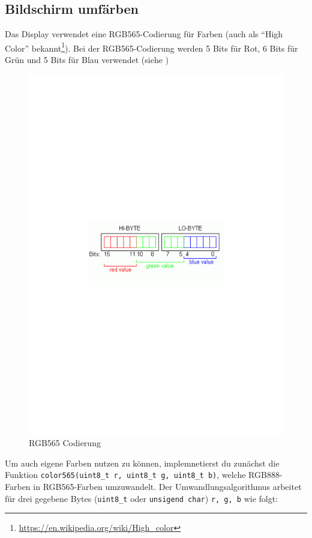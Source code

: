 \subsection{Bildschirm umfärben}
Das Display verwendet eine RGB565-Codierung für Farben (auch als \enquote{High Color} bekannt\footnote{\url{https://en.wikipedia.org/wiki/High_color}}).
Bei der RGB565-Codierung werden 5 Bits für Rot, 6 Bits für Grün und 5 Bits für Blau verwendet (siehe )
%
\begin{figure}
    \begin{centering}
        \includegraphics[width=.5\textwidth]{./05_c/figures/rgb565}
        \caption{RGB565 Codierung}
        \label{fig:rgb565}
    \end{centering}
\end{figure}
%
Um auch eigene Farben nutzen zu können, implemnetierst du zunächst die Funktion \lstinline|color565(uint8_t r, uint8_t g, uint8_t b)|, welche RGB888-Farben in RGB565-Farben umzuwandelt.
Der Umwandlungsalgorithmus arbeitet für drei gegebene Bytes (\lstinline|uint8_t| oder \lstinline|unsigend char|) \lstinline|r, g, b| wie folgt:
